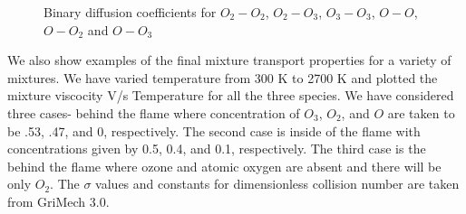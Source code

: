 \begin{figure}[H]


    \caption{Binary diffusion coefficients for $O_2-O_2$, $O_2-O_3$, $O_3-O_3$, $O-O$, $O-O_2$ and $O-O_3$}
\end{figure}


We also show examples of the final mixture transport properties for a
variety of mixtures. We have varied temperature from 300 K to 2700 K and plotted the
mixture viscocity V/s Temperature for all the three species.  We have
considered three cases- behind the flame where concentration of
$O_3$, $O_2$, and $O$ are taken to be .53, .47, and 0,
respectively. The second case is inside of the flame with
concentrations given by 0.5, 0.4, and 0.1, respectively. The third
case is the behind the flame where ozone and atomic oxygen are absent and
there will be only $O_2$. The $\sigma$ values and constants for
dimensionless collision number are taken from GriMech 3.0\cite{gri}.

